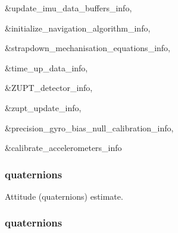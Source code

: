 \begin{DoxyCode}
 {&update_imu_data_buffers_info,
                                                                                                        
         &initialize_navigation_algorithm_info,
                                                                                                        
         &strapdown_mechanisation_equations_info,
                                                                                                        
         &time_up_data_info,
                                                                                                        
         &ZUPT_detector_info,
                                                                                                        
         &zupt_update_info,
                                                                                                        
         &precision_gyro_bias_null_calibration_info,
                                                                                                        
         &calibrate_accelerometers_info}
\end{DoxyCode}
\hypertarget{group__tables_ga059b83d370e7e6a5e9728a8f91943051}{
\subsubsection[{quaternions}]{ {\bf quaternions}}}
\label{group__tables_ga059b83d370e7e6a5e9728a8f91943051}


\-Attitude (quaternions) estimate. 

\hypertarget{group__tables_ga059b83d370e7e6a5e9728a8f91943051}{
\subsubsection[{quaternions}]{ {\bf quaternions}}}
\label{group__tables_ga059b83d370e7e6a5e9728a8f91943051}


